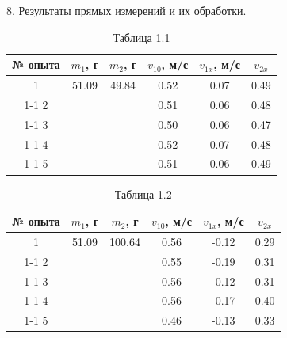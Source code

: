 \documentclass[12pt]{article}
\begin{document}
\begin{flushleft}
    8. Результаты прямых измерений и их обработки. \\

    \begin{table}[h]
        \centering
        \renewcommand{\arraystretch}{1.3}
        \setlength{\tabcolsep}{8pt}
        \captionsetup{justification=centering, font=bf}
        \caption{Таблица 1.1}
        \begin{tabular}{|c|c|c|c|c|c|}
            \hline
            № опыта & $m_1$, г & $m_2$, г & $v_{10}$, м/с & $v_{1x}$, м/с & $ v_{2x} $ \\
            \hline
            1 & 51.09 & 49.84 & 0.52 & 0.07 & 0.49 \\
            \cline{1-1}
            \cline{4-6}
            2 &       &     & 0.51 & 0.06 & 0.48 \\
            \cline{1-1}
            \cline{4-6}
            3 &       &     & 0.50 & 0.06 & 0.47 \\
            \cline{1-1}
            \cline{4-6}
            4 &       &     & 0.52 & 0.07 & 0.48 \\
            \cline{1-1}
            \cline{4-6}
            5 &       &     & 0.51 & 0.06 & 0.49 \\
            \hline
        \end{tabular}
    \end{table}

    \newpage


    \begin{table}[h]
        \centering
        \renewcommand{\arraystretch}{1.3}
        \setlength{\tabcolsep}{8pt}
        \captionsetup{justification=centering, font=bf}
        \caption{Таблица 1.2}
        \begin{tabular}{|c|c|c|c|c|c|}
            \hline
            № опыта & $m_1$, г & $m_2$, г & $v_{10}$, м/с & $v_{1x}$, м/с & $ v_{2x} $ \\
            \hline
            1 & 51.09 & 100.64 & 0.56 & -0.12 & 0.29 \\
            \cline{1-1}
            \cline{4-6}
            2 &       &     & 0.55 & -0.19 & 0.31 \\
            \cline{1-1}
            \cline{4-6}
            3 &       &     & 0.56 & -0.12 & 0.31 \\
            \cline{1-1}
            \cline{4-6}
            4 &       &     & 0.56 & -0.17 & 0.40 \\
            \cline{1-1}
            \cline{4-6}
            5 &       &     & 0.46 & -0.13 & 0.33 \\
            \hline
        \end{tabular}
    \end{table}


\end{flushleft}
\end{document}
